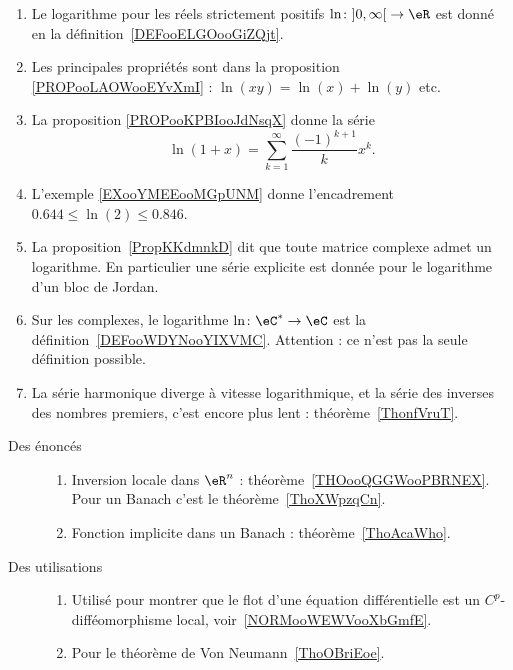 \begin{enumerate}
    \item
    Le logarithme pour les réels strictement positifs \( \ln\colon \mathopen] 0 , \infty \mathclose[\to \eR\) est donné en la définition~\ref{DEFooELGOooGiZQjt}.
    \item
        Les principales propriétés sont dans la proposition \ref{PROPooLAOWooEYvXmI} : \( \ln(xy)=\ln(x)+\ln(y)\) etc.
    \item
        La proposition \ref{PROPooKPBIooJdNsqX} donne la série
        \begin{equation}
            \ln(1+x)=\sum_{k=1}^{\infty}\frac{ (-1)^{k+1} }{ k }x^k.
        \end{equation}
    \item
        L'exemple \ref{EXooYMEEooMGpUNM} donne l'encadrement \( 0.644\leq \ln(2)\leq 0.846\).
    \item
        La proposition~\ref{PropKKdmnkD} dit que toute matrice complexe admet un logarithme. En particulier une série explicite est donnée pour le logarithme d'un bloc de Jordan.
    \item
        Sur les complexes, le logarithme \( \ln \colon \eC^*\to \eC\) est la définition~\ref{DEFooWDYNooYIXVMC}. Attention : ce n'est pas la seule définition possible.
    \item
        La série harmonique diverge à vitesse logarithmique, et la série des inverses des nombres premiers, c'est encore plus lent : théorème~\ref{ThonfVruT}.
\end{enumerate}

       \begin{description}
           \item[Des énoncés]
               \begin{enumerate}
    \item Inversion locale dans \( \eR^n\) : théorème~\ref{THOooQGGWooPBRNEX}. Pour un Banach c'est le théorème~\ref{ThoXWpzqCn}.
    \item
        Fonction implicite dans un Banach : théorème~\ref{ThoAcaWho}.
               \end{enumerate}
           \item[Des utilisations]
               \begin{enumerate}

    \item
        Utilisé pour montrer que le flot d'une équation différentielle est un \( C^p\)-difféomorphisme local, voir~\ref{NORMooWEWVooXbGmfE}. %
    \item
        Pour le théorème de Von Neumann~\ref{ThoOBriEoe}.
               \end{enumerate}
       \end{description}

